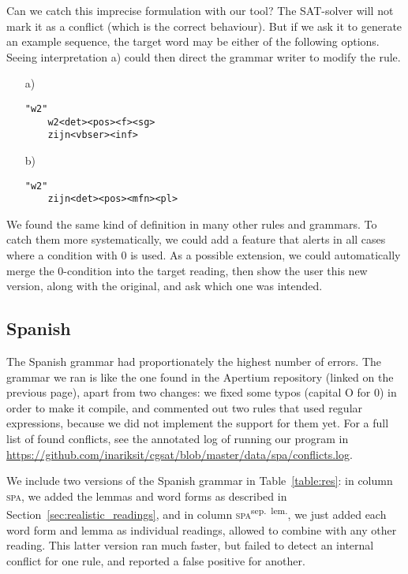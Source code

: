 Can we catch this imprecise formulation with our tool? The SAT-solver will not mark it as a conflict (which is the correct behaviour). But if we ask it to generate an example sequence, the target word may be either of the following options. Seeing interpretation a) could then direct the grammar writer to modify the rule.

\begin{itemize}
\item[a)] \begin{verbatim}
"w2"
    w2<det><pos><f><sg>
    zijn<vbser><inf>
\end{verbatim}

\item[b)] \begin{verbatim}
"w2"
    zijn<det><pos><mfn><pl>
\end{verbatim}
\end{itemize}


We found the same kind of definition in many other rules and grammars.
To catch them more systematically, we could add a feature that alerts in all cases where a condition with 0 is used. As a possible extension, we could automatically merge the 0-condition into the target reading, then show the user this new version, along with the original, and ask which one was intended.


\subsection{Spanish} The Spanish grammar had proportionately the
highest number of errors. The grammar we ran is like the one
found in the Apertium repository (linked on the previous page), 
apart from two changes: we fixed some typos (capital O for 0) in order to make it compile, and
commented out two rules that used regular expressions, because we did not implement the support for them yet.
For a full list of found conflicts, see the annotated log of running our program in \url{
https://github.com/inariksit/cgsat/blob/master/data/spa/conflicts.log}. 


We include two versions of the Spanish grammar in Table~\ref{table:res}: in column \textsc{spa}, we added the lemmas and word forms as described in Section~\ref{sec:realistic_readings}, and in column \textsc{spa}\textsuperscript{sep.~lem.}, we just added each word form and lemma as individual readings, allowed to combine with any other reading. 
This latter version ran much faster, but failed to detect an internal conflict for one rule, and reported a false positive for another. 


